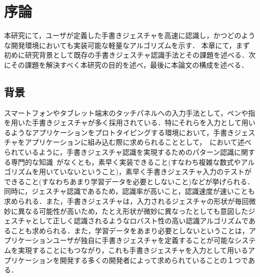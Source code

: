 \chapter{序論}
本研究にて，ユーザが定義した手書きジェスチャを高速に認識し，かつどのような開発環境においても実装可能な軽量なアルゴリズムを示す．
本章にて，まず初めに研究背景として既存の手書きジェスチャ認識手法とその課題を述べる．次にその課題を解決すべく本研究の目的を述べ，最後に本論文の構成を述べる．

\section{背景}
スマートフォンやタブレット端末のタッチパネルへの入力手法として，ペンや指を用いた手書きジェスチャが多く採用されている．特にそれらを入力として用いるようなアプリケーションをプロトタイピングする環境において，手書きジェスチャをアプリケーションに組み込む際に求められることとして，~\cite{Rettig:1994:PTF:175276.175288}において述べられているように，手書きジェスチャ認識を実現するためのパターン認識に関する専門的な知識~\cite{Hong00constructingfinite, Anderson2004HiddenMM,Sezgin:2005:HES:1040830.1040899, Cao:2005:EOA:1089508.1089540, Pittman:1991:RHT:108844.108914, Cho:2006:NGR:1711617.1711649,Rubine:1991:SGE:127719.122753, Anthony:2010:LMR:1839214.1839258}がなくとも，素早く実装できること(すなわち複雑な数式やアルゴリズムを用いていないということ)，素早く手書きジェスチャ入力のテストができること(すなわちあまり学習データを必要としないこと)などが挙げられる．同時に，ジェスチャ認識であるため，認識率が高いこと，認識速度が速いことも求められる．また，手書きジェスチャは，入力されるジェスチャの形状が毎回微妙に異なる可能性が高いため，たとえ形状が微妙に異なったとしても意図したジェスチャとして正しく認識されるようなロバスト性の高い認識アルゴリズムであることも求められる．また，学習データをあまり必要としないということは，アプリケーションユーザが独自に手書きジェスチャを定義することが可能なシステムを実現することにもつながり，これも手書きジェスチャを入力として用いるアプリケーションを開発する多くの開発者によって求められていることの１つである．

